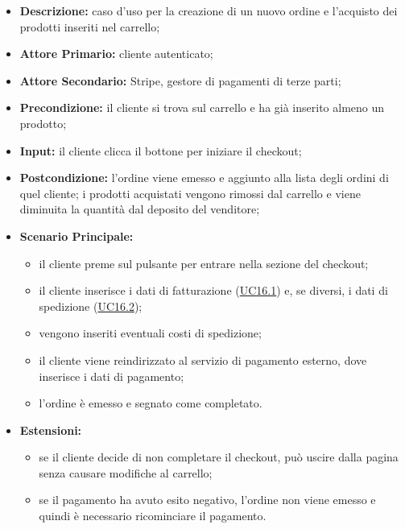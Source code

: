                 \begin{itemize}
                \item \textbf{Descrizione:} caso d'uso per la creazione di un nuovo ordine e l'acquisto dei prodotti inseriti nel carrello;
                \item \textbf{Attore Primario:} cliente autenticato;
                \item \textbf{Attore Secondario:} Stripe, gestore di pagamenti di terze parti;
                \item \textbf{Precondizione:} il cliente si trova sul carrello e ha già inserito almeno un prodotto;
                \item \textbf{Input:} il cliente clicca il bottone per iniziare il checkout;
                \item \textbf{Postcondizione:} l'ordine viene emesso e aggiunto alla lista degli ordini di quel cliente; i prodotti acquistati vengono rimossi dal carrello e viene diminuita la quantità dal deposito del venditore;
                \item \textbf{Scenario Principale:} 
                    \begin{itemize}
                        \item il cliente preme sul pulsante per entrare nella sezione del checkout;
                        \item il cliente inserisce i dati di fatturazione (\hyperref[sec:UC16.1]{UC16.1}) e, se diversi, i dati di spedizione (\hyperref[sec:UC16.2]{UC16.2});
                        \item vengono inseriti eventuali costi di spedizione;
                        \item il cliente viene reindirizzato al servizio di pagamento esterno, dove inserisce i dati di pagamento;
                        \item l'ordine è emesso e segnato come completato.
                    \end{itemize}
                \item \textbf{Estensioni:}
                    \begin{itemize}
                        \item se il cliente decide di non completare il checkout, può uscire dalla pagina senza causare modifiche al carrello;
                        \item se il pagamento ha avuto esito negativo, l'ordine non viene emesso e quindi è necessario ricominciare il pagamento.
                    \end{itemize}
            \end{itemize}
